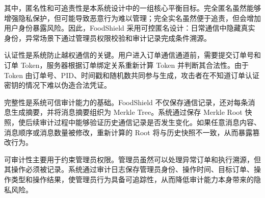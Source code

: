 其中，匿名性和可追责性是本系统设计中的一组核心平衡目标。完全匿名虽然能够增强隐私保护，但可能导致恶意行为难以管理；完全实名虽然便于追责，但会增加用户身份暴露风险。因此，FoodShield 采用可控匿名设计：日常通信中隐藏真实身份，异常场景下通过管理员权限校验和审计记录完成条件溯源。

认证性是系统防止越权通信的关键。用户进入订单通信通道前，需要提交订单号和订单 Token，服务器根据订单绑定关系重新计算 Token 并判断其合法性。由于 Token 由订单号、PID、时间戳和随机数共同参与生成，攻击者在不知道订单认证密钥的情况下难以伪造合法凭证。

完整性是系统可信审计能力的基础。FoodShield 不仅保存通信记录，还对每条消息生成摘要，并将消息摘要组织为 Merkle Tree。系统通过保存 Merkle Root 快照，使后续审计过程中能够验证历史通信记录是否发生变化。如果任意消息内容、消息顺序或消息数量被修改，重新计算的 Root 将与历史快照不一致，从而暴露篡改行为。

可审计性主要用于约束管理员权限。管理员虽然可以处理异常订单和执行溯源，但其操作必须被记录。系统通过审计日志保存管理员身份、操作时间、目标订单、操作类型和操作结果，使管理员行为具备可追踪性，从而降低审计能力本身带来的隐私风险。
